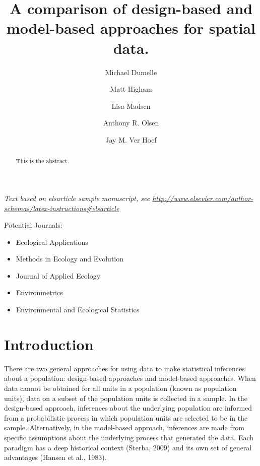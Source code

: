 \documentclass[]{elsarticle} %
\providecommand{\tightlist}{%
  \setlength{\itemsep}{0pt}\setlength{\parskip}{0pt}}
\begin{document}
\begin{frontmatter}

  \title{A comparison of design-based and model-based approaches for
spatial data.}
    \author[USEPA]{Michael Dumelle}
    \author[STLAW]{Matt Higham}
    \author[OSU]{Lisa Madsen}
  
    \author[USEPA]{Anthony R. Olsen}
  
    \author[NOAA]{Jay M. Ver Hoef}
  
      \address[USEPA]{United States Environmental Protection Agency, 200
SW 35th St, Corvallis, Oregon, 97333}
    \address[STLAW]{Saint Lawrence University Department of Math,
Computer Science, and Statistics, 23 Romoda Drive, Canton, New York,
13617}
    \address[OSU]{Oregon State University Department of Statistics, 239
Weniger Hall, Corvallis, Oregon, 97331}
    \address[NOAA]{Marine Mammal Laboratory, Alaska Fisheries Science
Center, National Oceanic and Atmospheric Administration, Seattle,
Washington, 98115}
  
  \begin{abstract}
  This is the abstract.
  \end{abstract}
  
 \end{frontmatter}

\emph{Text based on elsarticle sample manuscript, see
\url{http://www.elsevier.com/author-schemas/latex-instructions\#elsarticle}}

Potential Journals:

\begin{itemize}
\tightlist
\item
  Ecological Applications
\item
  Methods in Ecology and Evolution
\item
  Journal of Applied Ecology
\item
  Environmetrics
\item
  Environmental and Ecological Statistics
\end{itemize}

\hypertarget{sec:introduction}{%
\section{Introduction}\label{sec:introduction}}

There are two general approaches for using data to make statistical
inferences about a population: design-based approaches and model-based
approaches. When data cannot be obtained for all units in a population
(known as population units), data on a subset of the population units is
collected in a sample. In the design-based approach, inferences about
the underlying population are informed from a probabilistic process in
which population units are selected to be in the sample. Alternatively,
in the model-based approach, inferences are made from specific
assumptions about the underlying process that generated the data. Each
paradigm has a deep historical context (Sterba, 2009) and its own set of
general advantages (Hansen et al., 1983).
\end{document}
